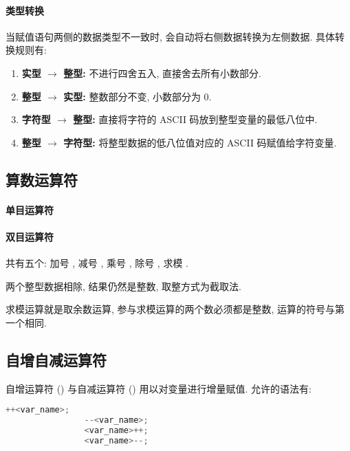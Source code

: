         \paragraph{类型转换 \\}
            \hspace*{2em} 当赋值语句两侧的数据类型不一致时, 会自动将右侧数据转换为左侧数据. 具体转换规则有:
                \begin{enumerate}
                    \item \textbf{实型 $\to$ 整型:} 不进行四舍五入, 直接舍去所有小数部分.
                    \item \textbf{整型 $\to$ 实型:} 整数部分不变, 小数部分为 0.
                    \item \textbf{字符型 $\to$ 整型:} 直接将字符的 ASCII 码放到整型变量的最低八位中.
                    \item \textbf{整型 $\to$ 字符型:} 将整型数据的低八位值对应的 ASCII 码赋值给字符变量.
                \end{enumerate}

    \subsection{算数运算符}
        \paragraph{单目运算符}

        \paragraph{双目运算符}
            \hspace*{2em} 共有五个: 加号 \Code{+}, 减号 \Code{-}, 乘号 \Code{*}, 除号 \Code{/}, 求模 \Code{\%}.

            \begin{Notation}
                \item 两个整型数据相除, 结果仍然是整数, 取整方式为截取法.
                \item 求模运算就是取余数运算, 参与求模运算的两个数必须都是整数, 运算的符号与第一个相同.
            \end{Notation}

    \subsection{自增自减运算符}
        自增运算符 (\Code{++}) 与自减运算符 (\Code{--}) 用以对变量进行增量赋值. 允许的语法有:
            \begin{lstlisting}[language = {C}, gobble = 16]
                ++<var_name>;
                --<var_name>;
                <var_name>++;
                <var_name>--;
            \end{lstlisting}

